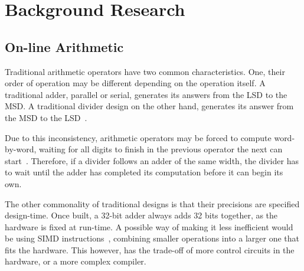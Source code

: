 \section{Background Research}

\subsection{On-line Arithmetic}
Traditional arithmetic operators have two common characteristics.
One, their order of operation may be different depending on the operation
itself.
A traditional adder, parallel or serial, generates its answers from the LSD to
the MSD.
A traditional divider design on the other hand, generates its answer from
the MSD to the LSD~\cite{Brent1}\cite{Srinivas1}.

Due to this inconsistency, arithmetic operators may be forced to compute
word-by-word, waiting for all digits to finish in the previous operator the next
can start~\cite{Zhao1}.
Therefore, if a divider follows an adder of the same width, the divider has to
wait until the adder has completed its computation before it can begin its own.

The other commonality of traditional designs is that their precisions are
specified design-time. Once built, a 32-bit adder always adds 32 bits together,
as the hardware is fixed at run-time.
A possible way of making it less inefficient would be using SIMD
instructions~\cite{Duncan1}, combining smaller operations into a larger
one that fits the hardware.
This however, has the trade-off of more control circuits in the hardware, or
a more complex compiler.

